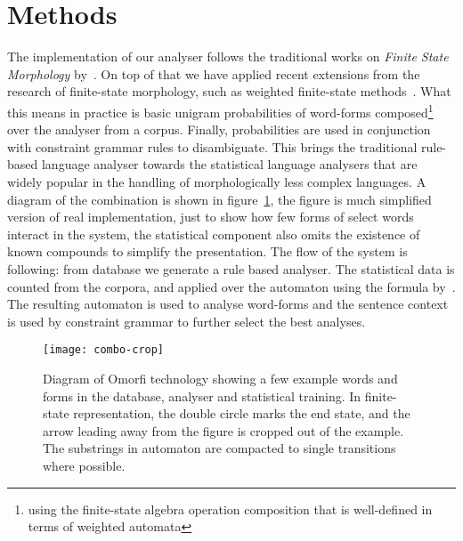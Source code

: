 \documentclass[a4paper,12pt]{article}
\begin{document}
\section{Methods}
\label{sec:methods}

The implementation of our analyser follows the
traditional works on \textit{Finite State
Morphology} by~\citet{beesley2003finite}. On top of
that we have applied recent extensions from the
research of finite-state morphology, such as
weighted finite-state
methods~\citep{openfst,hfst2012}. What this means in
practice is basic unigram probabilities of
word-forms composed\footnote{using the finite-state
algebra operation composition that is well-defined
in terms of weighted automata} over the analyser
from a corpus.  Finally, probabilities are used in
conjunction with constraint grammar rules to
disambiguate.  This brings the traditional
rule-based language analyser towards the statistical
language analysers that are widely popular in the
handling of morphologically less complex languages.
A diagram of the combination is shown in
figure~\ref{fig:combo}, the figure is much
simplified version of real implementation, just to
show how few forms of select words interact in the
system, the statistical component also omits the
existence of known compounds to simplify the
presentation. The flow of the system is following:
from database we generate a rule based analyser. The
statistical data is counted from the corpora, and
applied over the automaton using the formula
by~\cite{pirinen2009weighted}. The resulting
automaton is used to analyse word-forms and the
sentence context is used by constraint grammar to
further select the best analyses.

\begin{figure}[tb!]
    \texttt{[image: combo-crop]}
    \caption{Diagram of Omorfi technology showing a
        few example words and forms in the database,
        analyser and statistical training. In
        finite-state representation, the double
        circle marks the end state, and the arrow
        leading away from the figure is cropped out
        of the example. The substrings in automaton
        are compacted to single transitions where
    possible. \label{fig:combo}}
\end{figure}
\end{document}
